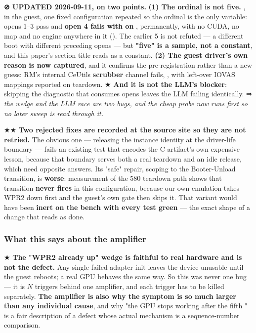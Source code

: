 \documentclass[10.5pt]{article}
\begin{document}
\begin{warnbox}\small
\textbf{⊘ UPDATED 2026-09-11, on two points.} \textbf{(1) The ordinal is not five.} \measured{}
, in the guest, one fixed configuration repeated so the ordinal is the only variable:
opens 1--3 pass and \textbf{open 4 fails with  on },
permanently, with no CUDA, no map and no engine anywhere in it
(). The earlier 5 is not refuted --- a different boot
with different preceding opens --- but \textbf{"five" is a sample, not a constant}, and this
paper's section title reads as a constant. \textbf{(2) The guest driver's own reason is now
captured}, and it confirms the pre-registration rather than a new guess: RM's internal CeUtils
\textbf{scrubber} channel fails, , with left-over IOVAS mappings
reported on teardown. ★ \textbf{And it is not the LLM's blocker}: skipping the diagnostic that
consumes opens leaves the LLM failing identically. ⇒ \emph{the wedge and the LLM race are two
bugs, and the cheap probe now runs first so no later sweep is read through it.}
\end{warnbox}

★★ \textbf{Two rejected fixes are recorded at the source site so they are not retried.} The
obvious one --- releasing the instance identity at the driver-life boundary --- fails an existing
test that encodes the C artifact's own expensive lesson, because that boundary serves both a real
teardown and an idle release, which need opposite answers. Its "safe" repair, scoping to the
Booter-Unload transition, is \textbf{worse}: measurement of the 580 teardown path shows that
transition \textbf{never fires} in this configuration, because our own emulation takes WPR2 down
first and the guest's own gate then skips it. That variant would have been \textbf{inert on the
bench with every test green} --- the exact shape of a change that reads as done.

\subsubsection*{What this says about the amplifier}

★ \textbf{The "WPR2 already up" wedge is faithful to real hardware and is not the defect.} Any
single failed adapter init leaves the device unusable until the guest reboots; a real GPU behaves
the same way. So this was never one bug --- it is $N$ triggers behind one amplifier, and each
trigger has to be killed separately. \textbf{The amplifier is also why the symptom is so much
larger than any individual cause}, and why "the GPU stops working after the fifth
" is a fair description of a defect whose actual mechanism is a
sequence-number comparison.
\end{document}
